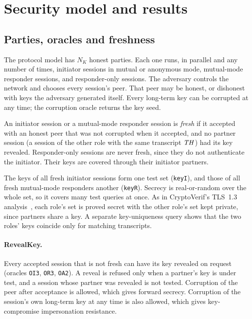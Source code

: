 \section{Security model and results}\label{sec:model}

\subsection{Parties, oracles and freshness}\label{sec:freshness}

The protocol model has $N_K$ honest parties. Each one runs, in parallel and
any number of times, initiator sessions in mutual or anonymous mode,
mutual-mode responder sessions, and responder-only sessions. The adversary
controls the network and chooses every session's peer. That peer may be
honest, or dishonest with keys the adversary generated itself. Every
long-term key can be corrupted at any time; the corruption oracle returns
the key seed.

\begin{definition}[Freshness]
An initiator session or a mutual-mode responder session is \emph{fresh} if
it accepted with an honest peer that was not corrupted when it accepted, and
no partner session (a session of the other role with the same transcript
$\mathit{TH}$) had its key revealed. Responder-only sessions are never fresh, since
they do not authenticate the initiator. Their keys are covered through their
initiator partners.
\end{definition}

The keys of all fresh initiator sessions form one test set (\texttt{keyI}),
and those of all fresh mutual-mode responders another (\texttt{keyR}).
Secrecy is real-or-random over the whole set, so it covers many test queries
at once. As in CryptoVerif's TLS~1.3 analysis~\cite{BBK17}, each role's set
is proved secret with the other role's set kept private, since partners share
a key. A separate key-uniqueness query shows that the two roles' keys
coincide only for matching transcripts.

\paragraph{RevealKey.} Every accepted session that is not fresh can have its
key revealed on request (oracles \texttt{OI3}, \texttt{OR3}, \texttt{OA2}). A
reveal is refused only when a partner's key is under test, and a session
whose partner was revealed is not tested. Corruption of the peer after
acceptance is allowed, which gives forward secrecy. Corruption of the
session's own long-term key at any time is also allowed, which gives
key-compromise impersonation resistance.

